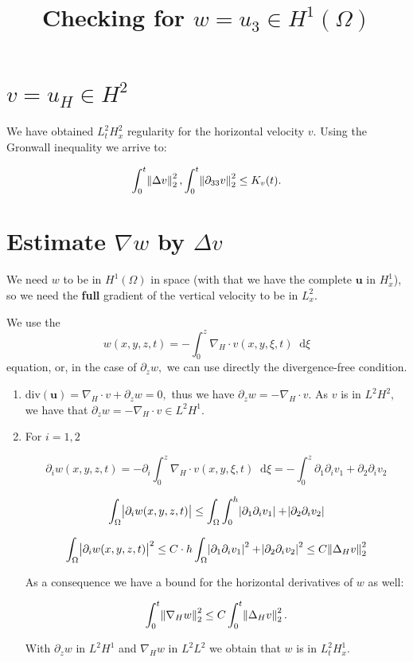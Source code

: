 \documentclass[11pt]{article}
\title{Checking for $w = u_3 \in H^1 (\Omega)$ }
\newcommand*\diff{\mathop{}\!\mathrm{d}}
\begin{document}
\date{}
\maketitle

\section{$v = u_H \in H^2$}

We have obtained $L^2_t H^2_x$ regularity for the horizontal velocity $v.$ Using the Gronwall inequality we arrive to:

$$ \int_0^t \norm{\Delta v}_2^2, \int_0^t \norm{\partial_{33}v}_2^2 \leq K_v(t).$$

\section{Estimate $\nabla w$ by $\Delta v$}

We need $w$ to be in $H^1(\Omega)$ in space (with that we have the complete $\mathbf{u}$ in $H^1_x$), so we need the \textbf{full} gradient of the vertical velocity to be in $L^2_x.$

We use the $$ w(x,y,z,t) = - \int_0^z \nabla_H \cdot v(x,y,\xi, t) \diff \xi$$ equation, or, in the case of $\partial_z w,$ we can use directly the divergence-free condition.

\begin{enumerate}

\item $\text{div}(\mathbf{u}) = \nabla_H \cdot v + \partial_z w = 0,$ thus we have $\partial_z w = - \nabla_H \cdot v.$ As $v$ is in $L^2 H^2,$ we have that $\partial_z w = - \nabla_H \cdot v \in L^2 H^1.$

\item For $i = 1,2$

$$ \partial_i w(x,y,z,t) = - \partial_i \int_0^z \nabla_H \cdot v(x,y,\xi, t) \diff \xi = - \int_0^z \partial_1 \partial_i v_1 + \partial_2 \partial_i v_2$$

$$ \int_\Omega \abs{\partial_i w(x,y,z,t)} \leq \int_\Omega \int_0^h \abs{\partial_1 \partial_i v_1} + \abs{\partial_2 \partial_i v_2}$$

$$ \int_\Omega \abs{\partial_i w(x,y,z,t)}^2 \leq C \cdot h \int_\Omega \abs{\partial_1 \partial_i v_1}^2 + \abs{\partial_2 \partial_i v_2}^2 \leq C \norm{\Delta_H v}^2_2$$

As a consequence we have a bound for the horizontal derivatives of $w$ as well:

$$\int_0^t \norm{\nabla_H w}_2^2 \leq C \int_0^t \norm{\Delta_H v}_2^2.$$

With $\partial_z w$ in $L^2 H^1$ and $\nabla_H w$ in $L^2 L^2$ we obtain that $w$ is in $L^2_t H^1_x.$

\end{enumerate}
\end{document}
